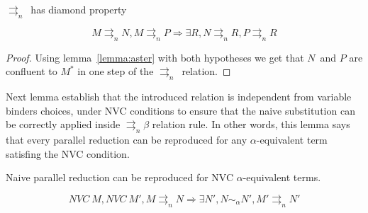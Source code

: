 \documentclass{article}
\newcommand{\alp}{\ensuremath{\alpha}}
\newcommand{\alpsym}{\ensuremath{\sim_\alpha}}
\newcommand{\pn}{\ensuremath{\rightrightarrows_n}}
\begin{document}
\begin{theorem}{\pn\ has diamond property}

  \begin{minipage}{0.7\linewidth}
  \[ M \pn N, M \pn P \Rightarrow \exists R, N \pn R, P \pn R \]
\end{minipage}
  \begin{minipage}{0.3\linewidth}
\end{minipage}

\end{theorem}\label{theorem:parallelnaive}

\begin{proof}
  Using lemma~\ref{lemma:aster} with both hypotheses we get that $N$\ and $P$ are confluent to $M^*$ in one step of the \pn\ relation.
\end{proof}

Next lemma establish that the introduced relation is independent from variable binders choices, under NVC conditions to ensure that the naive substitution can be correctly applied inside $\pn\beta$ relation rule. In other words, this lemma says that every parallel reduction can be reproduced for any \alp-equivalent term  satisfing the NVC condition.

\begin{lemma}{Naive parallel reduction can be reproduced for NVC \alp-equivalent terms.} \label{lemma:parallelrenaming}


  \[ NVC\ M, NVC\ M', M \pn N \Rightarrow \exists N', N  \alpsym N', M' \pn N' \]
  \begin{center}
  \end{center}

\end{lemma}
\end{document}
